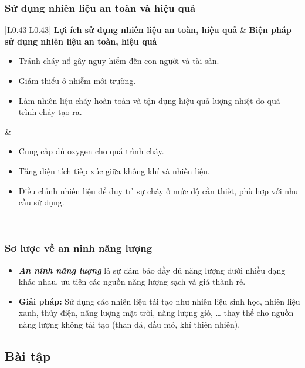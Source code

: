 \documentclass[Main.tex]{subfiles}
\begin{document}
\begin{kienthuccannho}
	\subsubsection{Sử dụng nhiên liệu an toàn và hiệu quả}
	\begin{center}
		\renewcommand{\arraystretch}{1.15}
		\begin{tabular}{|L{0.43\linewidth}|L{0.43\linewidth}|}
			\hline
			\textbf{Lợi ích sử dụng nhiên liệu an toàn, hiệu quả}
			&
			\textbf{Biện pháp sử dụng nhiên liệu an toàn, hiệu quả}
			\\
			\hline
			\begin{itemize}
				\item Tránh cháy nổ gây nguy hiểm đến con người và tài sản.
				\item Giảm thiểu ô nhiễm môi trường.
				\item Làm nhiên liệu cháy hoàn toàn và tận dụng hiệu quả lượng nhiệt do quá trình cháy tạo ra.
			\end{itemize}
			&
			\begin{itemize}
				\item Cung cấp đủ oxygen cho quá trình cháy.
				\item Tăng diện tích tiếp xúc giữa không khí và nhiên liệu.
				\item Điều chỉnh nhiên liệu để duy trì sự cháy ở mức độ cần thiết, phù hợp với nhu cầu sử dụng.
			\end{itemize}
			\\
			\hline
		\end{tabular}
	\end{center}
	\subsubsection{Sơ lược về an ninh năng lượng}
	\begin{itemize}
		\item \textbf{\textit{An ninh năng lượng}} là sự đảm bảo đầy đủ năng lượng dưới nhiều dạng khác nhau, ưu tiên các nguồn năng lượng sạch và giá thành rẻ.
		\item \textbf{Giải pháp:} Sử dụng các nhiên liệu tái tạo như nhiên liệu sinh học, nhiên liệu xanh, thủy điện, năng lượng mặt trời, năng lượng gió, … thay thế cho nguồn năng lượng không tái tạo (than đá, dầu mỏ, khí thiên nhiên).
	\end{itemize}
\end{kienthuccannho}
\subsection{Bài tập}
\end{document}
